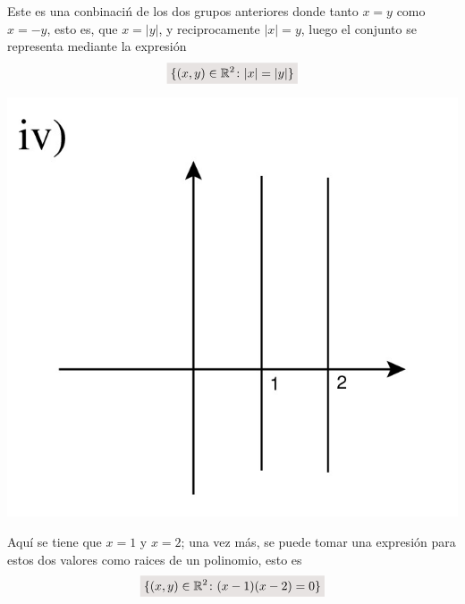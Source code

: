 \documentclass[a4paper,11pt]{article}
\newcommand{\real}{\mathbb{R}}
\newcommand{\resalta}[1]{\colorbox{g}{$\displaystyle #1$}}
\begin{document}
\begin{enumerate}
\begin{enumerate}[label = \roman*)]
\begin{minipage}[c]{0.3\linewidth}
            \end{minipage}
            \begin{minipage}[c]{0.7\linewidth}
                Este es una conbinaci\'n de los dos grupos anteriores donde tanto $x=y$ como $x=-y$, esto es, que $x=|y|$, y reciprocamente $|x|=y$, luego el conjunto se representa mediante la expresi\'on
                \begin{equation}
                    \notag \resalta{\{(x,y)\in \real^{2} \colon |x|=|y|\}}
                \end{equation}
            \end{minipage}
            \begin{minipage}[c]{0.3\linewidth}
                \centering
                    \includegraphics[scale=0.15]{4ii-4}
            \end{minipage}
            \begin{minipage}[c]{0.7\linewidth}
                Aqu\'i se tiene que $x=1$ y $x=2$; una vez m\'as, se puede tomar una expresi\'on para estos dos valores como raices de un polinomio, esto es
                \begin{equation}
                    \notag \resalta{\{(x,y)\in \real^{2} \colon (x-1)(x-2)=0\}}
                \end{equation}
            \end{minipage}
            \begin{minipage}[c]{0.3\linewidth}

\end{minipage}
\end{enumerate}
\end{enumerate}
\end{document}

